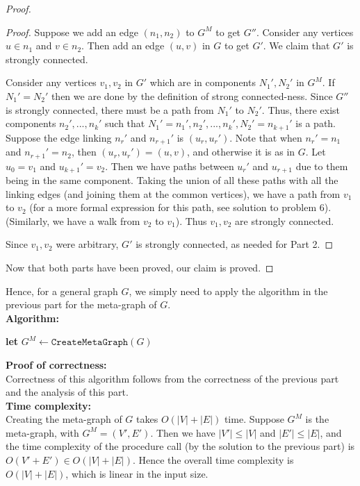 \documentclass[answers]{exam}
\begin{document}
\begin{questions}
\begin{parts}
\begin{solution}
\begin{proof}
\begin{proof}
Suppose we add an edge $(n_1, n_2)$ to $G^M$ to get $G''$. Consider any vertices $u \in n_1$ and $v \in n_2$. Then add an edge $(u, v)$ in $G$ to get $G'$. We claim that $G'$ is strongly connected.

Consider any vertices $v_1, v_2$ in $G'$ which are in components $N_1', N_2'$ in $G^M$. If $N_1' = N_2'$ then we are done by the definition of strong connected-ness. Since $G''$ is strongly connected, there must be a path from $N_1'$ to $N_2'$. Thus, there exist components $n_2', ..., n_k'$ such that $N_1' = n_1', n_2', ..., n_k', N_2' = n_{k + 1}'$ is a path. Suppose the edge linking $n_r'$ and $n_{r+1}'$ is $(u_r, u_r')$. Note that when $n_r' = n_1$ and $n_{r + 1}' = n_2$, then $(u_r, u_r') = (u, v)$, and otherwise it is as in $G$. Let $u_0 = v_1$ and $u_{k + 1}' = v_2$. Then we have paths between $u_r'$ and $u_{r + 1}$ due to them being in the same component. Taking the union of all these paths with all the linking edges (and joining them at the common vertices), we have a path from $v_1$ to $v_2$ (for a more formal expression for this path, see solution to problem 6). (Similarly, we have a walk from $v_2$ to $v_1$). Thus $v_1, v_2$ are strongly connected.

Since $v_1, v_2$ were arbitrary, $G'$ is strongly connected, as needed for Part 2.
\end{proof}

Now that both parts have been proved, our claim is proved.
\end{proof}

Hence, for a general graph $G$, we simply need to apply the algorithm in the previous part for the meta-graph of $G$.\\

\textbf{Algorithm:}

\begin{algorithmic}[1]
\State \textbf{let} $G^M \gets \mathtt{CreateMetaGraph}(G)$
\State {}
\EndProcedure
\end{algorithmic}

\textbf{Proof of correctness:}\\
Correctness of this algorithm follows from the correctness of the previous part and the analysis of this part.\\

\textbf{Time complexity:}\\
Creating the meta-graph of $G$ takes $O(|V| + |E|)$ time. Suppose $G^M$ is the meta-graph, with $G^M = (V', E')$. Then we have $|V'| \le |V|$ and $|E'| \le |E|$, and the time complexity of the procedure call (by the solution to the previous part) is $O(V' + E') \in O(|V| + |E|)$. Hence the overall time complexity is $O(|V| + |E|)$, which is linear in the input size.


\end{solution}
\end{parts}
\end{questions}
\end{document}
